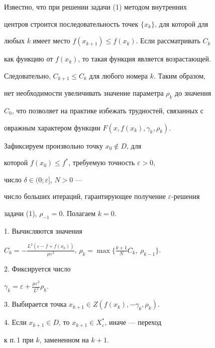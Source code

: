 \begin{notenonum}


Известно, что при решении задачи (1) методом внутренних


центров строится последовательность точек $\{x_k\}$, для которой для


любых $k$ имеет место $f(x_{k+1})\le f(x_k)$. Если рассматривать $C_k$


как функцию от $f(x_k)$, то такая функция является возрастающей.


Следовательно, $C_{k+1}\le C_k$ для любого номера $k$. Таким образом,


нет необходимости увеличивать значение параметра $\rho_k$ до значения


$C_0$, что позволяет на практике избежать трудностей, связанных с


овражным характером функции $F(x,f(x_k),\gamma_k,\rho_k)$. 


\end{notenonum}





\begin{alg}


Зафиксируем произвольно точку $x_0\notin D$, для


которой $f(x_0)\le f^*$, требуемую точность $\varepsilon>0$, 


число $\delta\in(0;\varepsilon]$, $N>0$ ---


число больших итераций, гарантирующее получение $\varepsilon$-решения


задачи (1), $\rho_{-1}=0$. Полагаем $k=0$.





1. Вычисляются значения


$C_k=-\frac{L^2(\varepsilon-\overline{f}+f(x_k))}{\mu\varepsilon


^2}$, $\rho_k=\max\{\frac{k+1}{N}C_k,\ \rho_{k-1}\}$. 





2. Фиксируется число


$\gamma_k=\varepsilon+\frac{\mu\varepsilon^2}{L^2}\rho_k$.





3. Выбирается точка $x_{k+1}\in Z(f(x_k),-\gamma_k,\rho_k)$.





4. Если $x_{k+1}\in D$, то $x_{k+1}\in X_{\varepsilon}^*$, иначе --- переход


к п.\,1 при $k$, замененном на $k+1$. 


\end{alg}





